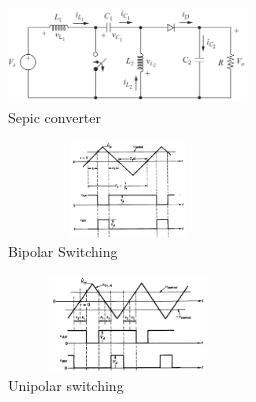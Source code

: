 \documentclass[twocolumn, ]{article}
\begin{document}
\begin{figure}[!ht]
	\includegraphics[width=2.5in,height=1in]{sepic_operation.png}
	\caption{Sepic converter}
\end{figure}

\begin{figure}[!ht]
	\includegraphics[width=2.5in,height=1in]{bipolar1.png}
	\caption{Bipolar Switching}
\end{figure}
\begin{figure}[!ht]
	\includegraphics[width=2.5in,height=1in]{unipolar1.png}
	\caption{Unipolar switching}
\end{figure}
\end{document}
